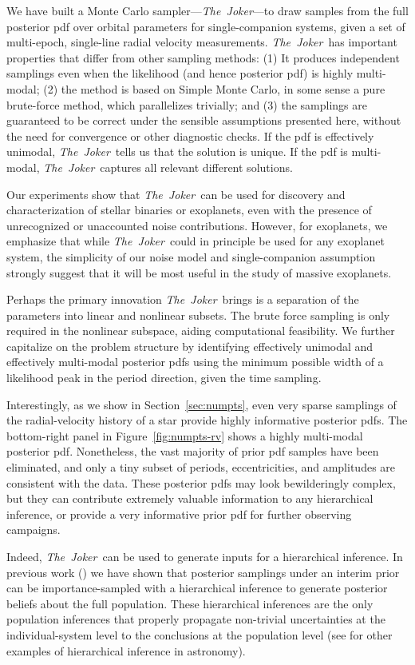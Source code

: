 \documentclass[manuscript, letterpaper]{aastex6}
\newcommand{\project}[1]{\textsl{#1}}
\newcommand{\samplername}{\project{The~Joker}}
\newcommand{\sectionname}{Section}
\newcommand{\figname}{Figure}
\newcommand{\resp}[1]{#1}
\begin{document}
We have built a Monte Carlo sampler---\samplername---to draw samples from the
full posterior pdf over orbital parameters for single-companion systems,
given a set of multi-epoch, single-line radial velocity measurements.
\samplername\ has important properties that differ from other sampling methods:
(1) It produces \resp{independent} samplings even when the likelihood (and hence
posterior pdf) is highly multi-modal; (2) the method is based on Simple Monte
Carlo,  in some sense a pure brute-force method, which parallelizes trivially;
and (3) the samplings are guaranteed to be correct under the sensible
assumptions presented here, without the need for convergence or other diagnostic
checks.
If the pdf is effectively unimodal, \samplername\ tells us that the solution is
unique.
If the pdf is multi-modal, \samplername\ captures all relevant different
solutions.

Our experiments show that \samplername\ can be used for discovery and
characterization of stellar binaries or exoplanets, even with the presence of
unrecognized or unaccounted noise contributions.
However, for exoplanets, we emphasize that while \samplername\ could in
principle be used for any exoplanet system, the simplicity of our noise model
and single-companion assumption strongly suggest that it will be most useful in
the study of massive exoplanets.

Perhaps the primary innovation \samplername\ brings is a separation of the
parameters into linear and nonlinear subsets.
The brute force sampling is only required in the nonlinear subspace, aiding
computational feasibility.
We further capitalize on the problem structure by identifying effectively
unimodal and effectively multi-modal posterior pdfs using the minimum possible
width of a likelihood peak in the period direction, given the time sampling.

Interestingly, as we show in \sectionname~\ref{sec:numpts}, even very sparse
samplings of the radial-velocity history of a star provide highly
informative posterior pdfs.  The bottom-right panel in
\figname~\ref{fig:numpts-rv} shows a highly multi-modal posterior pdf.
Nonetheless, the vast majority of prior pdf samples have been eliminated, and
only a tiny subset of periods, eccentricities, and amplitudes are consistent
with the data.
These posterior pdfs may look bewilderingly complex, but they can contribute
extremely valuable information to any hierarchical inference, or
provide a very informative prior pdf for further observing campaigns.

Indeed, \samplername\  can be used to generate inputs for a hierarchical inference.
In previous work (\citealt{Hogg:2010, Foreman-Mackey:2014}) we have shown
that posterior samplings under an interim prior can be importance-sampled
with a hierarchical inference to generate posterior beliefs about the
full population.
These hierarchical inferences are the only population inferences
that properly propagate non-trivial uncertainties at the
individual-system level to the conclusions at the population level \resp{(see
\citealt{Mandel:2011, Strader:2004, Brewer:2013, Brewer:2014} for other examples
of hierarchical inference in astronomy)}.
\end{document}
